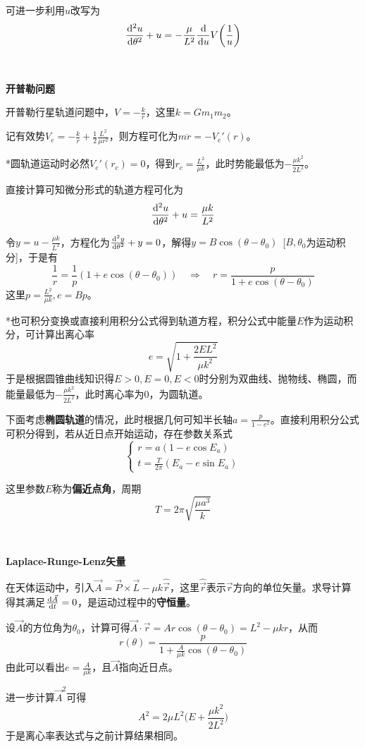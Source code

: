 \documentclass[a4paper,UTF8,fontset=windows]{ctexart}
\newcommand*{\dr}{\hspace{0.07em}\mathrm{d}}
\begin{document}
可进一步利用$u$改写为
$$\frac{\dr^2u}{\dr\theta^2}+u=-\frac{\mu}{L^2}\frac{\dr}{\dr u}V\bigg(\frac{1}{u}\bigg)$$

\

\textbf{开普勒问题}

开普勒行星轨道问题中，$V=-\frac{k}{r}$，这里$k=Gm_1m_2$。

记有效势$V_e=-\frac{k}{r}+\frac{1}{2}\frac{L^2}{\mu r^2}$，则方程可化为$m\ddot{r}=-V_e'(r)$。

*圆轨道运动时必然$V_e'(r_c)=0$，得到$r_c=\frac{L^2}{\mu k}$，此时势能最低为$-\frac{\mu k^2}{2L^2}$。

直接计算可知微分形式的轨道方程可化为
$$\frac{\dr^2u}{\dr\theta^2}+u=\frac{\mu k}{L^2}$$

令$y=u-\frac{\mu k}{L^2}$，方程化为$\frac{\dr^2y}{\dr\theta^2}+y=0$，解得$y=B\cos(\theta-\theta_0)$\ [$B,\theta_0$为运动积分]，于是有
$$\frac{1}{r}=\frac{1}{p}(1+e\cos(\theta-\theta_0))\quad\Rightarrow\quad r=\frac{p}{1+e\cos(\theta-\theta_0)}$$
这里$p=\frac{L^2}{\mu k},e=Bp$。

*也可积分变换或直接利用积分公式得到轨道方程，积分公式中能量$E$作为运动积分，可计算出离心率
$$e=\sqrt{1+\frac{2EL^2}{\mu k^2}}$$
于是根据圆锥曲线知识得$E>0,E=0,E<0$时分别为双曲线、抛物线、椭圆，而能量最低为$-\frac{\mu k^2}{2L^2}$，此时离心率为0，为圆轨道。

下面考虑\textbf{椭圆轨道}的情况，此时根据几何可知半长轴$a=\frac{p}{1-e^2}$。直接利用积分公式可积分得到，若从近日点开始运动，存在参数关系式
$$\begin{cases}r=a(1-e\cos E_a)\\t=\frac{T}{2\pi}(E_a-e\sin E_a)\end{cases}$$

这里参数$E$称为\textbf{偏近点角}，周期
$$T=2\pi\sqrt{\frac{\mu a^3}{k}}$$

\

\textbf{Laplace-Runge-Lenz矢量}

在天体运动中，引入$\vec{A}=\vec{P}\times\vec{L}-\mu k\hat{\vec{r}}$，这里$\hat{\vec{r}}$表示$\vec{r}$方向的单位矢量。求导计算得其满足$\frac{\dr\vec{A}}{\dr t}=0$，是运动过程中的\textbf{守恒量}。

设$\vec{A}$的方位角为$\theta_0$，计算可得$\vec{A}\cdot\vec{r}=Ar\cos(\theta-\theta_0)=L^2-\mu kr$，从而
$$r(\theta)=\frac{p}{1+\frac{A}{\mu k}\cos(\theta-\theta_0)}$$
由此可以看出$e=\frac{A}{\mu k}$，且$\vec{A}$指向近日点。

进一步计算$\vec{A}^2$可得
$$A^2=2\mu L^2\bigg(E+\frac{\mu k^2}{2L^2}\bigg)$$
于是离心率表达式与之前计算结果相同。
\end{document}
